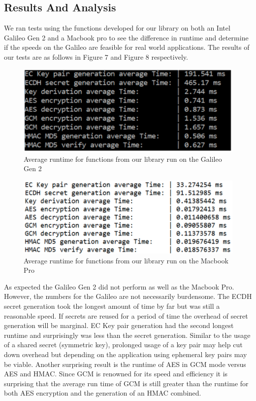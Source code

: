 \subsection{Results And Analysis}
	We ran tests using the functions developed for our library on both an Intel Galileo Gen 2 and a Macbook pro to see the difference in runtime and determine if the speeds on the Galileo are feasible for real world applications. The results of our tests are as follows in Figure 7 and Figure 8 respectively.

 \begin{figure}[t]
	\centering
	\includegraphics[width=12cm,height=0.7\textheight,keepaspectratio]{./figures/figure_7}
	\center\caption[font=footnote]{Average runtime for functions from our library run on the Galileo Gen 2}
\end{figure}

 \begin{figure}[t]
	\centering
	\includegraphics[width=12cm,height=0.7\textheight,keepaspectratio]{./figures/figure_8}
	\center\caption[font=footnote]{Average runtime for functions from our library run on the Macbook Pro}
\end{figure}


As expected the Galileo Gen 2 did not perform as well as the Macbook Pro. However, the numbers for the Galileo are not necessarily burdensome. The ECDH secret generation took the longest amount of time by far but was still a reasonable speed. If secrets are reused for a period of time the overhead of secret generation will be marginal. EC Key pair generation had the second longest runtime and surprisingly was less than the secret generation. Similar to the usage of a shared secret (symmetric key), prolonged usage of a key pair may help cut down overhead but depending on the application using ephemeral key pairs may be viable. Another surprising result is the runtime of AES in GCM mode versus AES and HMAC. Since GCM is renowned for its speed and efficiency it is surprising that the average run time of GCM is still greater than the runtime for both AES encryption and the generation of an HMAC combined.

